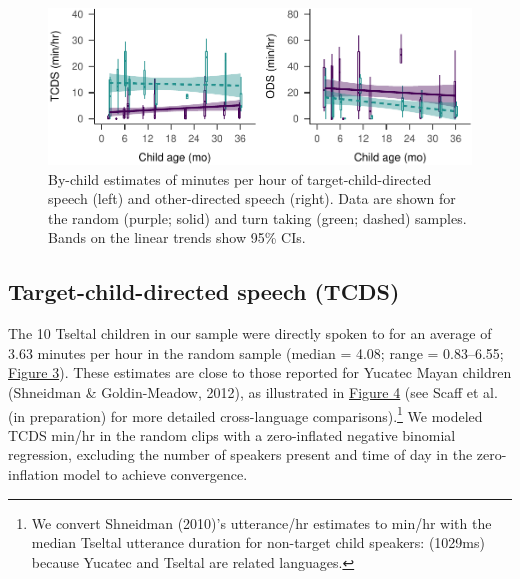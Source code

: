 \documentclass[floatsintext,man]{apa6}
\theoremstyle{definition}
\theoremstyle{definition}
\theoremstyle{definition}
\theoremstyle{remark}
\begin{document}
\begin{figure}
\centering
\includegraphics{Tseltal-CLE_files/figure-latex/fig3-1.pdf}
\caption{\label{fig:fig3}By-child estimates of minutes per hour of
target-child-directed speech (left) and other-directed speech (right).
Data are shown for the random (purple; solid) and turn taking (green;
dashed) samples. Bands on the linear trends show 95\% CIs.}
\end{figure}

\subsection{Target-child-directed speech
(TCDS)}\label{target-child-directed-speech-tcds}

The 10 Tseltal children in our sample were directly spoken to for an
average of 3.63 minutes per hour in the random sample (median = 4.08;
range = 0.83--6.55; \protect\hyperlink{fig3}{Figure 3}). These estimates
are close to those reported for Yucatec Mayan children (Shneidman \&
Goldin-Meadow, 2012), as illustrated in \protect\hyperlink{fig4}{Figure
4} (see Scaff et al. (in preparation) for more detailed cross-language
comparisons).\footnote{We convert Shneidman (2010)'s utterance/hr
  estimates to min/hr with the median Tseltal utterance duration for
  non-target child speakers: (1029ms) because Yucatec and Tseltal are
  related languages.} We modeled TCDS min/hr in the random clips with a
zero-inflated negative binomial regression, excluding the number of
speakers present and time of day in the zero-inflation model to achieve
convergence.
\end{document}
